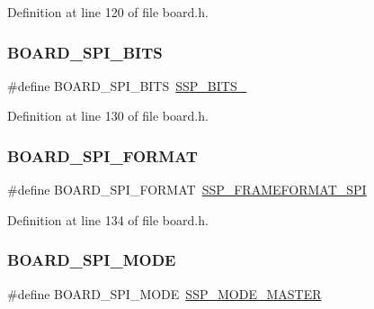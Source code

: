 Definition at line 120 of file board.\+h.

\mbox{\label{group__hal_gae88cc90089d786fbd464bdb7044d55ff}} 
\subsubsection{\texorpdfstring{B\+O\+A\+R\+D\+\_\+\+S\+P\+I\+\_\+\+B\+I\+TS}{BOARD\_SPI\_BITS}}
{\footnotesize\ttfamily \#define B\+O\+A\+R\+D\+\_\+\+S\+P\+I\+\_\+\+B\+I\+TS~\hyperlink{group___s_s_p__18_x_x__43_x_x_gga2f99e08511788c146ae9b35023e4a61cafed74a949c86fb130814553eeeaa28fc}{S\+S\+P\+\_\+\+B\+I\+T\+S\+\_}}



Definition at line 130 of file board.\+h.

\mbox{\label{group__hal_ga3d0601e312d64996d8cab493be3c0250}} 
\subsubsection{\texorpdfstring{B\+O\+A\+R\+D\+\_\+\+S\+P\+I\+\_\+\+F\+O\+R\+M\+AT}{BOARD\_SPI\_FORMAT}}
{\footnotesize\ttfamily \#define B\+O\+A\+R\+D\+\_\+\+S\+P\+I\+\_\+\+F\+O\+R\+M\+AT~\hyperlink{group___s_s_p__18_x_x__43_x_x_ggad3ae555ad43caa2b2a47bc4769d8fe50a04830722a3c3c26165b6e86944f80799}{S\+S\+P\+\_\+\+F\+R\+A\+M\+E\+F\+O\+R\+M\+A\+T\+\_\+\+S\+PI}}



Definition at line 134 of file board.\+h.

\mbox{\label{group__hal_ga1bbd961c030ce3a56149348fbe1d13e4}} 
\subsubsection{\texorpdfstring{B\+O\+A\+R\+D\+\_\+\+S\+P\+I\+\_\+\+M\+O\+DE}{BOARD\_SPI\_MODE}}
{\footnotesize\ttfamily \#define B\+O\+A\+R\+D\+\_\+\+S\+P\+I\+\_\+\+M\+O\+DE~\hyperlink{group___s_s_p__18_x_x__43_x_x_gga2a375ed10848e3661b9b015fea1cf39ba5395d2342a5a2564d683efe73700d604}{S\+S\+P\+\_\+\+M\+O\+D\+E\+\_\+\+M\+A\+S\+T\+ER}}



